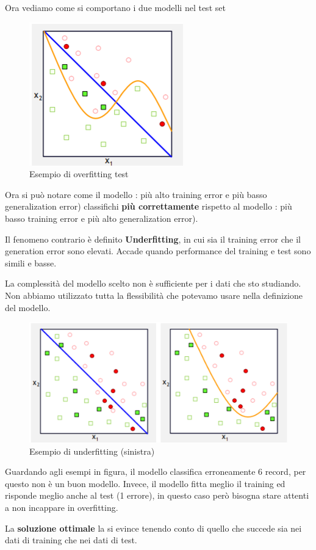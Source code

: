 Ora vediamo come si comportano i due modelli nel test set
\begin{figure}[H]
	\centering
	\includegraphics[height=0.3 \linewidth]{classification/pict/overfitting_test.png}
	\caption{Esempio di overfitting test}
\end{figure}
Ora si può notare come il modello {\color{blue}{blu}}: più alto training error e più basso generalization error) classifichi \textbf{più correttamente} rispetto al modello {\color{orange}{arancione}}: più basso training error e più alto generalization error).

\begin{defn}
Il fenomeno contrario è definito \textbf{Underfitting}, in cui sia il training error che il generation error sono elevati. Accade quando performance del training e test sono simili e basse.
\end{defn}
La complessità del modello scelto non è sufficiente per i dati che sto studiando. Non abbiamo utilizzato tutta la flessibilità che potevamo usare nella definizione del modello.

\begin{figure}[H]
	\centering
	\includegraphics[height=0.3 \linewidth]{classification/pict/underfitting_merge.png}
	\caption{Esempio di underfitting (sinistra)}
\end{figure}
Guardando agli esempi in figura, il modello {\color{blue}{blu}} classifica erroneamente 6 record, per questo non è un buon modello. Invece, il modello {\color{orange}{arancione}} fitta meglio il training ed risponde meglio anche al test (1 errore), in questo caso però bisogna stare attenti a non incappare in overfitting.
 
La \textbf{soluzione ottimale} la si evince tenendo conto di quello che succede sia nei dati di training che nei dati di test.

